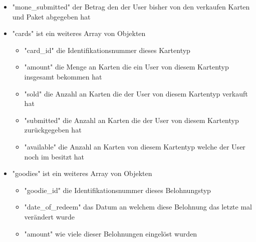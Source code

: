 \begin{itemize}
\begin{itemize}
						\item "mone\_submitted" der Betrag den der User bisher von den verkaufen Karten und Paket abgegeben hat
						\item "cards" ist ein weiteres Array von Objekten
						\begin{itemize}
							\item "card\_id" die Identifikationsnummer dieses Kartentyp
							\item "amount" die Menge an Karten die ein User von diesem Kartentyp insgesamt bekommen hat
							\item "sold" die Anzahl an Karten die der User von diesem Kartentyp verkauft hat
							\item "submitted" die Anzahl an Karten die der User von diesem Kartentyp zurückgegeben hat
							\item "available" die Anzahl an Karten von diesem Kartentyp welche der User noch im besitzt hat
						\end{itemize}
						\item "goodies" ist ein weiteres Array von Objekten
						\begin{itemize}
							\item "goodie\_id" die Identifikationsnummer dieses Belohnungstyp
							\item "date\_of\_redeem" das Datum an welchem diese Belohnung das letzte mal verändert wurde
							\item "amount" wie viele dieser Belohnungen eingelöst wurden
						\end{itemize}
					\end{itemize}
				\end{itemize}
			
		\newpage
		
